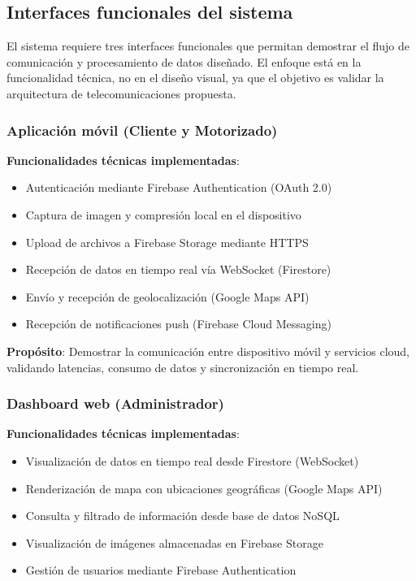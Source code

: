 \subsection{Interfaces funcionales del sistema}

El sistema requiere tres interfaces funcionales que permitan demostrar el flujo de comunicación y procesamiento de datos diseñado. El enfoque está en la funcionalidad técnica, no en el diseño visual, ya que el objetivo es validar la arquitectura de telecomunicaciones propuesta.

\subsubsection{Aplicación móvil (Cliente y Motorizado)}

\textbf{Funcionalidades técnicas implementadas}:
\begin{itemize}
    \item Autenticación mediante Firebase Authentication (OAuth 2.0)
    \item Captura de imagen y compresión local en el dispositivo
    \item Upload de archivos a Firebase Storage mediante HTTPS
    \item Recepción de datos en tiempo real vía WebSocket (Firestore)
    \item Envío y recepción de geolocalización (Google Maps API)
    \item Recepción de notificaciones push (Firebase Cloud Messaging)
\end{itemize}

\textbf{Propósito}: Demostrar la comunicación entre dispositivo móvil y servicios cloud, validando latencias, consumo de datos y sincronización en tiempo real.

\subsubsection{Dashboard web (Administrador)}

\textbf{Funcionalidades técnicas implementadas}:
\begin{itemize}
    \item Visualización de datos en tiempo real desde Firestore (WebSocket)
    \item Renderización de mapa con ubicaciones geográficas (Google Maps API)
    \item Consulta y filtrado de información desde base de datos NoSQL
    \item Visualización de imágenes almacenadas en Firebase Storage
    \item Gestión de usuarios mediante Firebase Authentication
\end{itemize}

